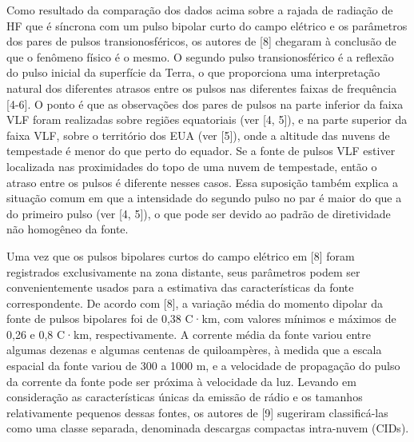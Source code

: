 \documentclass[a4paper, 12pt, onecolumn,singlespacing]{article}
\begin{document}
	Como resultado da comparação dos dados acima sobre a rajada de radiação de HF que é síncrona com um pulso bipolar curto do campo elétrico e os parâmetros dos pares de pulsos transionosféricos, os autores de [8] chegaram à conclusão de que o fenômeno físico é o mesmo. O segundo pulso transionosférico é a reflexão do pulso inicial da superfície da Terra, o que proporciona uma interpretação natural dos diferentes atrasos entre os pulsos nas diferentes faixas de frequência [4-6]. O ponto é que as observações dos pares de pulsos na parte inferior da faixa VLF foram realizadas sobre regiões equatoriais (ver [4, 5]), e na parte superior da faixa VLF, sobre o território dos EUA (ver [5]), onde a altitude das nuvens de tempestade é menor do que perto do equador. Se a fonte de pulsos VLF estiver localizada nas proximidades do topo de uma nuvem de tempestade, então o atraso entre os pulsos é diferente nesses casos. Essa suposição também explica a situação comum em que a intensidade do segundo pulso no par é maior do que a do primeiro pulso (ver [4, 5]), o que pode ser devido ao padrão de diretividade não homogêneo da fonte.
	
	Uma vez que os pulsos bipolares curtos do campo elétrico em [8] foram registrados exclusivamente na zona distante, seus parâmetros podem ser convenientemente usados para a estimativa das características da fonte correspondente. De acordo com [8], a variação média do momento dipolar da fonte de pulsos bipolares foi de 0,38 C·km, com valores mínimos e máximos de 0,26 e 0,8 C·km, respectivamente. A corrente média da fonte variou entre algumas dezenas e algumas centenas de quiloampères, à medida que a escala espacial da fonte variou de 300 a 1000 m, e a velocidade de propagação do pulso da corrente da fonte pode ser próxima à velocidade da luz. Levando em consideração as características únicas da emissão de rádio e os tamanhos relativamente pequenos dessas fontes, os autores de [9] sugeriram classificá-las como uma classe separada, denominada descargas compactas intra-nuvem (CIDs).
	
\end{document}
